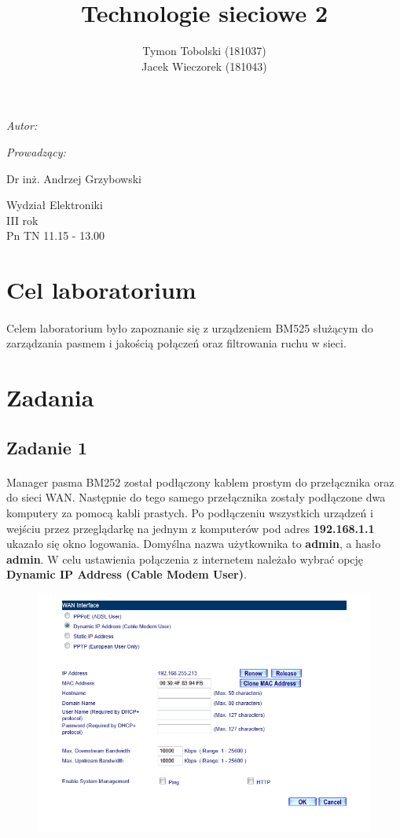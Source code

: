 \documentclass[wide,a4paper,titlepage,12pt] {article}
\title{Technologie sieciowe 2}
\author{Tymon Tobolski (181037)\\ Jacek Wieczorek (181043)}
\makeatletter
\renewcommand{\maketitle}{
\begin{titlepage}
  \begin{center}
    \vspace*{3cm}
    \LARGE \@title \par
    \vspace{2cm}
    \textit{\small Autor:}\par
    \normalsize \@author\par \normalsize
    \vspace{3cm}
    \textit{\small Prowadzący:}\par
    Dr inż. Andrzej Grzybowski\par
    \vspace{2cm}
    Wydział Elektroniki\\ III rok\\ Pn TN 11.15 - 13.00\par
    \vspace{4cm}
    \small \@date
  \end{center}
\end{titlepage}
}
\makeatother
\begin{document}
\maketitle
  \section{Cel laboratorium}
  \paragraph{}
  Celem laboratorium było zapoznanie się z urządzeniem BM525 służącym do zarządzania pasmem i jakością połączeń oraz filtrowania ruchu w sieci.


  \section{Zadania}


  \subsection{Zadanie 1}
  \paragraph{}
  Manager pasma BM252 został podłączony kablem prostym do przełącznika oraz do sieci WAN. Następnie do tego samego przełącznika zostały podłączone dwa komputery za pomocą kabli prastych.
  Po podłączeniu wszystkich urządzeń i wejściu przez przeglądarkę na jednym z komputerów pod adres \textbf{192.168.1.1} ukazało się okno logowania. Domyślna nazwa użytkownika to \textbf{admin}, a hasło \textbf{admin}.
  W celu ustawienia połączenia z internetem należało wybrać opcję \textbf{Dynamic IP Address (Cable Modem User)}.

  \begin{figure}[h!]
    \begin{center}
      \includegraphics[width=\textwidth]{1.PNG}
    \end{center}
  \end{figure}
\end{document}
